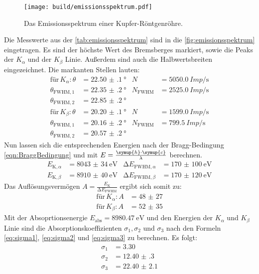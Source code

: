 \begin{figure}[H]
  \centering
  \texttt{[image: build/emissionsspektrum.pdf]}
  \caption{Das Emissionsspektrum einer Kupfer-Röntgenröhre.}
  \label{fig:emissionsspektrum}
\end{figure}

\noindent
Die Messwerte aus der \autoref{tab:emissionsspektrum} sind in die \autoref{fig:emissionsspektrum} eingetragen. Es sind der höchste Wert des Bremsberges markiert,
sowie die Peaks der $K_{\alpha}$ und der $K_{\beta}$ Linie. Außerdem sind auch die Halbwertsbreiten eingezeichnet.
Die markanten Stellen lauten:
\begin{align*}
  \text{für} \, K_{\alpha}: \theta &= \SI{22.50(10)}{\degree} & N &= \SI{5050.0}{Imp\per\second} \\
              \theta_{\text{FWHM}, 1} &= \SI{22.35(20)}{\degree} & N_{\text{FWHM}} &= \SI{2525.0}{Imp\per\second} \\
              \theta_{\text{FWHM}, 2} &= \SI{22.85(20)}{\degree}  \\
  \text{für} \, K_{\beta}: \theta &= \SI{20.20(10)}{\degree} & N &= \SI{1599.0}{Imp\per\second} \\
              \theta_{\text{FWHM}, 1} &= \SI{20.16(20)}{\degree} & N_{\text{FWHM}} &= \SI{799.5}{Imp\per\second} \\
              \theta_{\text{FWHM}, 2} &= \SI{20.57(20)}{\degree}  
\end{align*}
Nun lassen sich die entsprechenden Energien nach der Bragg-Bedingung \eqref{eqn:BraggBedingung} und mit $E = \frac{\symup{h} \cdot \symup{c}}{\lambda} $ berechnen. 
\begin{align*}
  E_{\text{K}, \alpha} &= \SI{8043(34)}{\electronvolt} & \increment E_{\text{FWHM}, \alpha } &= \SI{170(100)}{\electronvolt}\\
  E_{\text{K}, \beta} &= \SI{8910(40)}{\electronvolt}  & \increment E_{\text{FWHM}, \beta } &= \SI{170(120)}{\electronvolt}
\end{align*}
Das Auflösungsvermögen $A = \frac{E_{\text{K}}}{\increment E_{\text{FWHM}}}$ ergibt sich somit zu:
\begin{align*}
  \text{für} \, K_{\alpha}: A&= \num{48(27)}\\
  \text{für} \, K_{\beta}: A&= \num{52(35)}
\end{align*}
Mit der Absoprtionsenergie $E_{\text{abs}} = \SI{8980.47}{\electronvolt}$ \cite{E_abs} und den Energien der $K_{\alpha}$ und $K_{\beta}$ Linie sind die 
Absorptionskoeffizienten $\sigma_1, \sigma_2$ und $\sigma_3$ nach den Formeln \eqref{eq:sigma1}, \eqref{eq:sigma2} und \eqref{eq:sigma3} zu berechnen.
Es folgt:
\begin{align*}
  \sigma_1 &= \num{3.30}\\
  \sigma_2 &= \num{12.40(30)}\\
  \sigma_3 &= \num{22.40(210)}
\end{align*}


